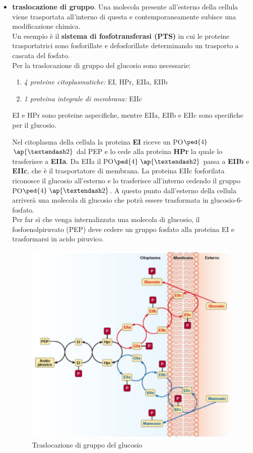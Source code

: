 \documentclass[11pt]{book}
\begin{document}
\begin{itemize}
\item \textbf{traslocazione di gruppo}. Una molecola presente all'esterno della cellula viene trasportata all’interno di questa e contemporaneamente subisce una modificazione chimica.\\
Un esempio è il \textbf{sistema di fosfotransferasi (PTS)} in cui le proteine trasportatrici sono fosforillate e defosforillate determinando un trasporto a cascata del fosfato.\\
Per la traslocazione di gruppo del glucosio sono necessarie:

\begin{enumerate}
\item \emph{4 proteine citoplasmatiche:} EI, HPr, EIIa, EIIb
\item \emph{1 proteina integrale di membrana:} EIIc
\end{enumerate}

EI e HPr sono proteine aspecifiche, mentre EIIa, EIIb e EIIc sono specifiche per il glucosio.

Nel citoplasma della cellula la proteina \textbf{EI} riceve un PO$\ped{4}$$\ap{–2}$ dal PEP e lo cede alla proteina \textbf{HPr} la quale lo trasferisce a \textbf{EIIa}. Da EIIa il PO$\ped{4}$$\ap{–2}$ passa a \textbf{EIIb} e \textbf{EIIc}, che è il trasportatore di membrana. La proteina EIIc fosforilata riconosce il glucosio all’esterno e lo trasferisce all’interno cedendo il gruppo PO$\ped{4}$$\ap{–2}$. A questo punto dall'esterno della cellula arriverà una molecola di glucosio che potrà essere trasformata in glucosio-6-fosfato.\\
Per far sì che venga internalizzata una molecola di glucosio, il fosfoenolpiruvato (PEP)  deve cedere un gruppo fosfato alla proteina EI e trasformarsi in acido piruvico.

\begin{figure}[htp]
\centering
\includegraphics[scale=0.5]{img/Traslocazione di gruppo.png}
\caption{Traslocazione di gruppo del glucosio}
\label{}
\end{figure}


\end{itemize}
\end{document}

